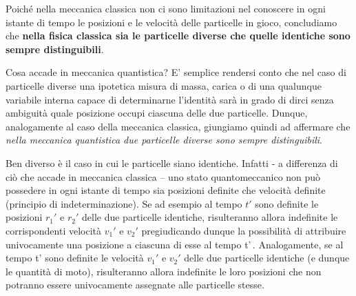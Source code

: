 Poiché nella meccanica classica non ci sono limitazioni nel conoscere in
ogni istante di tempo le posizioni e le velocità delle particelle in
gioco, concludiamo che \textbf{nella fisica classica sia le particelle
diverse che quelle identiche sono sempre distinguibili}.
\bigskip

Cosa accade in meccanica quantistica?
E' semplice rendersi conto che nel
caso di particelle diverse una ipotetica misura di massa, carica o di
una qualunque variabile interna capace di determinarne l'identità sarà
in grado di dirci senza ambiguità quale posizione occupi ciascuna delle
due particelle.
Dunque, analogamente al caso della meccanica classica,
giungiamo quindi ad affermare che \emph{nella meccanica quantistica due
particelle diverse sono sempre distinguibili}.

Ben diverso è il caso in cui le particelle siano identiche.
Infatti - a
differenza di ciò che accade in meccanica classica -- uno stato
quantomeccanico non può possedere in ogni istante di tempo sia posizioni
definite che velocità definite (principio di indeterminazione).
Se ad
esempio al tempo \(t'\) sono definite le posizioni \(r_{1}'\) e
\(r_{2}'\) delle due particelle identiche, risulteranno allora
indefinite le corrispondenti velocità \(v_{1}'\) e \(v_{2}'\)
pregiudicando dunque la possibilità di attribuire univocamente una
posizione a ciascuna di esse al tempo t'\,.
Analogamente, se al tempo
t' sono definite le velocità \(v_{1}'\) e \(v_{2}'\) delle due
particelle identiche (e dunque le quantità di moto), risulteranno allora
indefinite le loro posizioni che non potranno essere univocamente
assegnate alle particelle stesse.

